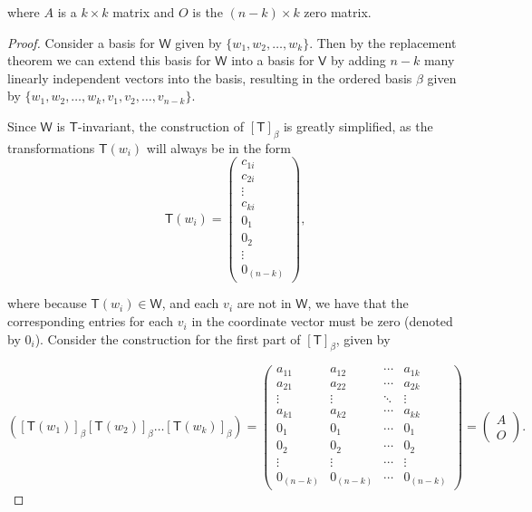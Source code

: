 \documentclass[11pt]{article}
\newcommand{\br}[1]{\left(#1\right)}
\newcommand{\sbr}[1]{\left[#1\right]}
\newcommand{\cbr}[1]{\{#1\}}
\begin{document}
where $A$ is a $k\times k$ matrix and $O$ is the $\br{n-k}\times k$ zero matrix.

\begin{proof}
    Consider a basis for $\mathsf{W}$ given by $\cbr{w_1,w_2,\dots,w_k}$. Then by the replacement theorem we can extend this basis for $\mathsf{W}$ into a basis for $\mathsf{V}$ by adding $n-k$ many linearly independent vectors into the basis, resulting in the ordered basis $\beta$ given by $\cbr{w_1,w_2,\dots,w_k,v_1,v_2,\dots,v_{n-k}}$.
    
    Since $\mathsf{W}$ is $\mathsf{T}$-invariant, the construction of $\sbr{\mathsf{T}}_{\beta}$ is greatly simplified, as the transformations $\mathsf{T}(w_i)$ will always be in the form $$\mathsf{T}(w_i) = \begin{pmatrix}
        c_{1i} \\
        c_{2i} \\
        \vdots \\
        c_{ki} \\
        0_{1} \\
        0_{2} \\
        \vdots \\
        0_{(n-k)}
    \end{pmatrix},$$

    where because $\mathsf{T}(w_i)\in\mathsf{W}$, and each $v_i$ are not in $\mathsf{W}$, we have that the corresponding entries for each $v_i$ in the coordinate vector must be zero (denoted by $0_{i}$). Consider the construction for the first part of $\sbr{\mathsf{T}}_{\beta}$, given by
    
    $$\br{\sbr{\mathsf{T}(w_1)}_{\beta} \sbr{\mathsf{T}(w_2)}_{\beta} \dots \sbr{\mathsf{T}(w_k)}_{\beta}} = \begin{pmatrix}
        a_{11} & a_{12} & \cdots & a_{1k} \\
        a_{21} & a_{22} & \cdots & a_{2k} \\
        \vdots & \vdots & \ddots & \vdots \\
        a_{k1} & a_{k2} & \cdots & a_{kk} \\
        0_{1} & 0_{1} & \cdots & 0_{1} \\
        0_{2} & 0_{2} & \cdots & 0_{2} \\
        \vdots  & \vdots & \cdots & \vdots \\
        0_{(n-k)} & 0_{(n-k)} & \cdots & 0_{(n-k)}
    \end{pmatrix} = \begin{pmatrix}
        A \\
        O
    \end{pmatrix}.$$


\end{proof}
\end{document}
